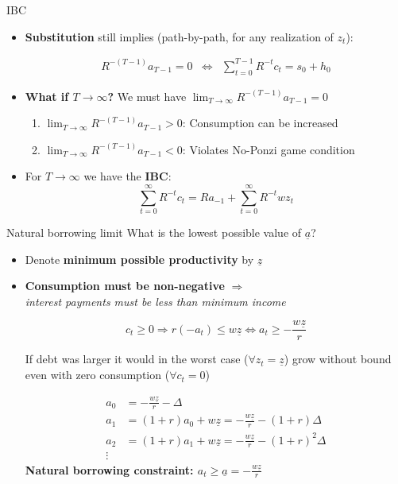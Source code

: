 \documentclass[
  10pt,
  ignorenonframetext,
  aspectratio=43,
  english,
  handout]{beamer}
\providecommand{\tightlist}{%
  \setlength{\itemsep}{0pt}\setlength{\parskip}{0pt}}
\begin{document}
\begin{frame}{IBC}
\protect{}\label{ibc-1}
\begin{itemize}
\item
  \textbf{Substitution} still implies (path-by-path, for any realization
  of \(z_{t}\)):

  \[
    \begin{aligned}
    R^{-(T-1)}a_{T-1}=0 & \Leftrightarrow & \sum^{T-1}_{t=0}R^{-t}c_{t}=s_{0}+h_{0}
    \end{aligned}
    \]
\item
  \textbf{What if \(T\rightarrow\infty\)?} We must have
  \(\lim_{T\rightarrow\infty}R^{-(T-1)}a_{T-1}=0\)

  \begin{enumerate}
  \tightlist
  \item
    \(\lim_{T\rightarrow\infty}R^{-(T-1)}a_{T-1}>0\): Consumption can be
    increased
  \item
    \(\lim_{T\rightarrow\infty}R^{-(T-1)}a_{T-1}<0\): Violates No-Ponzi
    game condition
  \end{enumerate}
\item
  For \(T\rightarrow\infty\) we have the \textbf{IBC}: \[
    \sum^{\infty}_{t=0}R^{-t}c_{t}=Ra_{-1}+\sum^{\infty}_{t=0}R^{-t}wz_{t}
    \]
\end{itemize}
\end{frame}

\begin{frame}{Natural borrowing limit}
\protect{}\label{natural-borrowing-limit}
What is the lowest possible value of \(\underline{a}\)?

\begin{itemize}
\item
  Denote \textbf{minimum possible productivity} by
  \textbf{\(\underline{z}\)}
\item
  \textbf{Consumption must be non-negative} \(\Rightarrow\)\\
  \emph{interest payments must be less than minimum income}

  \[
    c_{t}\geq0\Rightarrow r(-a_{t})\leq w\underline{z}\Leftrightarrow a_{t}\geq-\frac{w\underline{z}}{r}
    \]

  If debt was larger it would in the worst case
  (\(\forall z_{t}=\underline{z}\)) grow without bound even with zero
  consumption (\(\forall c_{t}=0\))

  \[
    \begin{aligned}
    a_{0} & =-\frac{w\underline{z}}{r}-\Delta\\
    a_{1} & =(1+r)a_{0}+w\underline{z}=-\frac{w\underline{z}}{r}-(1+r)\Delta\\
    a_{2} & =(1+r)a_{1}+w\underline{z}=-\frac{w\underline{z}}{r}-(1+r)^{2}\Delta\\
    \vdots
    \end{aligned}
    \] \textbf{Natural borrowing constraint:
  \(a_{t}\geq\underline{a}=-\frac{w\underline{z}}{r}\)}
\end{itemize}
\end{frame}
\end{document}
